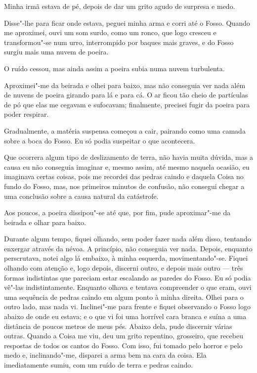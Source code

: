 Minha irmã estava de pé, depois de dar um grito agudo de surpresa e medo.

Disse"-lhe para ficar onde estava, peguei minha arma e corri até o Fosso. Quando me aproximei, ouvi um som
surdo, como um ronco, que logo cresceu e transformou"-se num urro, interrompido por baques mais graves, e do Fosso
surgiu mais uma nuvem de poeira.

O ruído cessou, mas ainda assim a poeira subia numa nuvem turbulenta.

Aproximei"-me da beirada e olhei para baixo, mas não conseguia ver nada além de nuvens de poeira girando para lá e para
cá. O ar ficou tão cheio de partículas de pó que elas me cegavam e sufocavam; finalmente, precisei fugir da poeira para
poder respirar.

Gradualmente, a matéria suspensa começou a cair, pairando como uma camada sobre a boca do Fosso. Eu só podia suspeitar
o que acontecera.

Que ocorrera algum tipo de deslizamento de terra, não havia muita dúvida, mas a causa eu não conseguia imaginar e,
mesmo assim, até mesmo naquela ocasião, eu imaginava certas coisas, pois me recordei das pedras caindo e daquela Coisa
no fundo do Fosso, mas, nos primeiros minutos de confusão, não consegui chegar a uma conclusão sobre a causa natural
da catástrofe.

Aos poucos, a poeira dissipou"-se até que, por fim, pude aproximar"-me da beirada e olhar para baixo.

Durante algum tempo, fiquei olhando, sem poder fazer nada além disso, tentando enxergar através da névoa. A princípio,
não conseguia ver nada. Depois, enquanto perscrutava, notei algo lá embaixo, à minha esquerda, movimentando"-se.
Fiquei olhando com atenção e, logo depois, discerni outro, e depois mais outro --- três formas indistintas que pareciam
estar escalando as paredes do Fosso. Eu só podia vê"-las indistintamente. Enquanto olhava e tentava compreender o que
eram, ouvi uma sequência de pedras caindo em algum ponto à minha direita. Olhei para o outro lado, mas nada vi. Inclinei"-me
para frente e fiquei observando o Fosso logo abaixo de onde eu estava; e o que vi foi uma horrível cara branca e suína
a uma distância de poucos metros de meus pés. Abaixo dela, pude discernir várias outras. Quando a Coisa me viu, deu um
grito repentino, grosseiro, que recebeu respostas de todos os cantos do Fosso. Com isso, fui tomado pelo horror e pelo
medo e, inclinando"-me, disparei a arma bem na cara da coisa. Ela imediatamente sumiu, com um ruído de terra e pedras
caindo.

